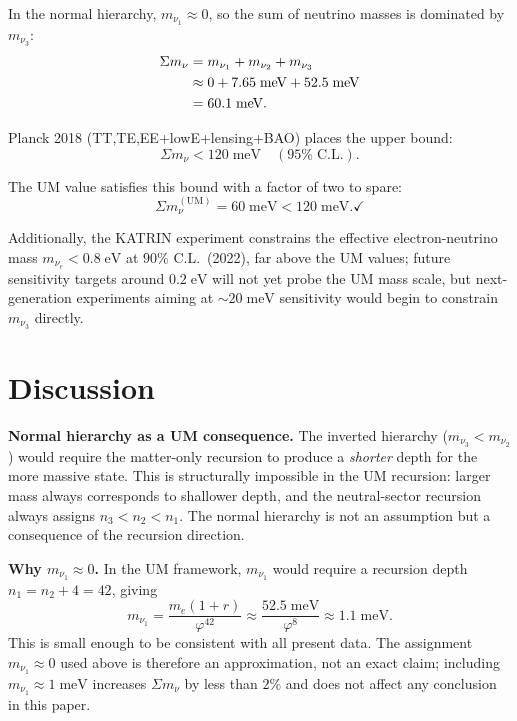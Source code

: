 \documentclass[12pt]{article}
\begin{document}
In the normal hierarchy, $m_{\nu_1} \approx 0$, so the sum of
neutrino masses is dominated by $m_{\nu_3}$:
\begin{align}
  \Sigma m_\nu &= m_{\nu_1} + m_{\nu_2} + m_{\nu_3} \notag\\
               &\approx 0 + 7.65\;\text{meV} + 52.5\;\text{meV} \notag\\
               &= 60.1\;\text{meV}.
\end{align}

Planck 2018 (TT,TE,EE+lowE+lensing+BAO) places the upper bound:
\begin{equation}
  \Sigma m_\nu < 120\;\text{meV} \quad (95\%\;\text{C.L.}).
\end{equation}

The UM value satisfies this bound with a factor of two to spare:
\[
  \Sigma m_\nu^{(\text{UM})} = 60\;\text{meV} < 120\;\text{meV}. \checkmark
\]

Additionally, the KATRIN experiment constrains the effective
electron-neutrino mass $m_{\nu_e} < 0.8\;\text{eV}$ at $90\%$
C.L.\ (2022), far above the UM values; future sensitivity targets
around $0.2\;\text{eV}$ will not yet probe the UM mass scale, but
next-generation experiments aiming at $\sim\!20\;\text{meV}$
sensitivity would begin to constrain $m_{\nu_3}$ directly.

\section{Discussion}

\textbf{Normal hierarchy as a UM consequence.}
The inverted hierarchy ($m_{\nu_3} < m_{\nu_2}$) would require the
matter-only recursion to produce a \emph{shorter} depth for the
more massive state.  This is structurally impossible in the UM
recursion: larger mass always corresponds to shallower depth, and
the neutral-sector recursion always assigns $n_3 < n_2 < n_1$.
The normal hierarchy is not an assumption but a consequence of the
recursion direction.

\textbf{Why $m_{\nu_1} \approx 0$.}
In the UM framework, $m_{\nu_1}$ would require a recursion depth
$n_1 = n_2 + 4 = 42$, giving
\begin{equation}
  m_{\nu_1} = \frac{m_e(1+r)}{\varphi^{42}}
            \approx \frac{52.5\;\text{meV}}{\varphi^8}
            \approx 1.1\;\text{meV}.
\end{equation}
This is small enough to be consistent with all present data.  The
assignment $m_{\nu_1} \approx 0$ used above is therefore an
approximation, not an exact claim; including $m_{\nu_1} \approx 1\;\text{meV}$
increases $\Sigma m_\nu$ by less than $2\%$ and does not affect
any conclusion in this paper.
\end{document}
